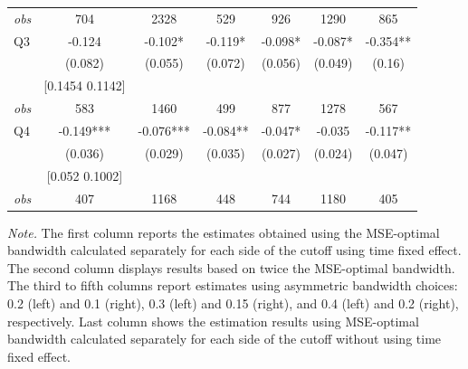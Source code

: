 \begin{table}[]
{\begin{tabular}{lcccccc}
\textit{obs} & 704 & 2328 & 529 & 926 & 1290 & 865 \\ 
Q3 & -0.124 & -0.102* & -0.119* & -0.098* & -0.087* & -0.354** \\ 
&(0.082)&(0.055) & (0.072)&(0.056)&(0.049)&(0.16)\\ 
& [0.1454 0.1142] & & & & & \\ 
\textit{obs} & 583 & 1460 & 499 & 877 & 1278 & 567 \\ 
Q4 & -0.149*** & -0.076*** & -0.084** & -0.047* & -0.035 & -0.117** \\ 
&(0.036)&(0.029) & (0.035)&(0.027)&(0.024)&(0.047)\\ 
& [0.052 0.1002] & & & & & \\ 
\textit{obs} & 407 & 1168 & 448 & 744 & 1180 & 405 \\ 
\hline 
\end{tabular}}{\textit{Note.} The first column reports the estimates obtained using the MSE-optimal bandwidth calculated separately for each side of the cutoff using time fixed effect. The second column displays results based on twice the MSE-optimal bandwidth. The third to fifth columns report estimates using asymmetric bandwidth choices: 0.2 (left) and 0.1 (right), 0.3 (left) and 0.15 (right), and 0.4 (left) and 0.2 (right), respectively. Last column shows the estimation results using MSE-optimal bandwidth calculated separately for each side of the cutoff without using time fixed effect.}
\end{table}

